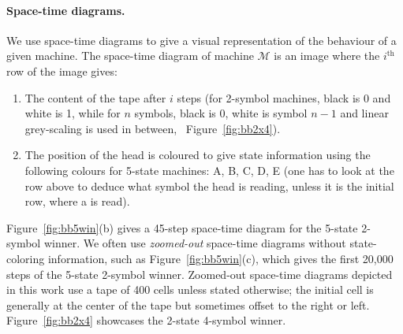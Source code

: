 \vspace{-1ex}
\paragraph*{Space-time diagrams.} We use space-time diagrams to give a visual representation of the behaviour of a given machine. The space-time diagram of machine $\mathcal{M}$ is an image where the $i^\text{th}$ row of the image gives:
\begin{enumerate}
    \item The content of the tape after $i$ steps (for 2-symbol machines, black is 0 and white is 1, while for $n$ symbols, black is 0, white is symbol $n-1$ and linear grey-scaling is used in between, \eg~Figure~\ref{fig:bb2x4}).
    \item The position of the head is coloured to give state information using the following colours for 5-state machines: \textcolor{colorA}{A},  \textcolor{colorB}{B},  \textcolor{colorC}{C},  \textcolor{colorD}{D},  \textcolor{colorE}{E} (one has to look at the row above to deduce what symbol the head is reading, unless it is the initial row, where a \szero is read).
\end{enumerate}

Figure~\ref{fig:bb5win}(b) gives a 45-step space-time diagram for the 5-state 2-symbol \BBfull winner. We often use \textit{zoomed-out} space-time diagrams without state-coloring information, such as Figure~\ref{fig:bb5win}(c), which gives the first 20,000 steps of the 5-state 2-symbol \BBfull winner. Zoomed-out space-time diagrams depicted in this work use a tape of 400 cells unless stated otherwise; the initial cell is generally at the center of the tape but sometimes offset to the right or left. Figure~\ref{fig:bb2x4} showcases the 2-state 4-symbol \BBfull winner.


